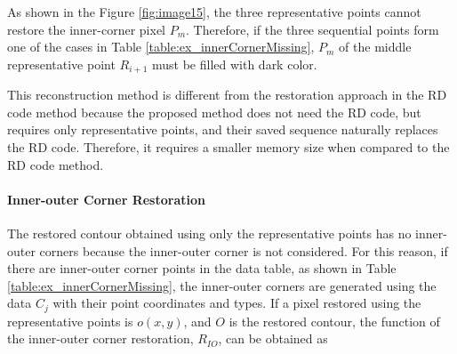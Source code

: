 
As shown in the Figure \ref{fig:image15}, the three representative points cannot restore the inner-corner pixel $P_m$. Therefore, if the three sequential points form one of the cases in Table \ref{table:ex_innerCornerMissing}, $P_m$ of the middle representative point $R_{i+1}$ must be filled with dark color. 


This reconstruction method is different from the restoration approach in the RD code method because the proposed method does not need the RD code, but requires only representative points, and their saved sequence naturally replaces the RD code. Therefore, it requires a smaller memory size when compared to the RD code method.

\paragraph{Inner-outer Corner Restoration}


The restored contour obtained using only the representative points has no inner-outer corners because the inner-outer corner is not considered. For this reason, if there are inner-outer corner points in the data table, as shown in Table \ref{table:ex_innerCornerMissing}, the inner-outer corners are generated using the data $C_j$ with their point coordinates and types. If a pixel restored using the representative points is $o(x, y)$, and $O$ is the restored contour, the function of the inner-outer corner restoration, $R_{IO}$, can be obtained as

